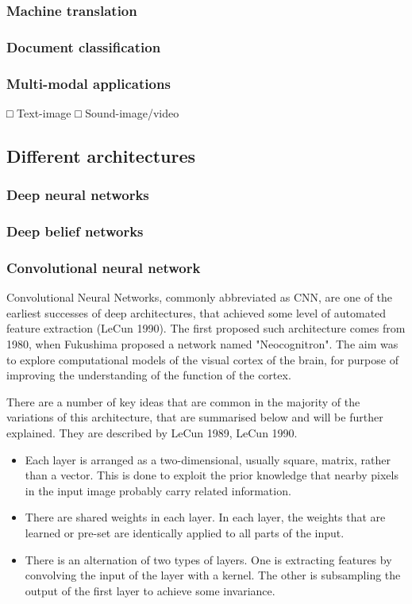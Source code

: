 \documentclass[]{article}
\begin{document}
		\subsubsection{Machine translation}
		\subsubsection{Document classification}
		\subsubsection{Multi-modal applications}
			□ Text-image
			□ Sound-image/video
	\subsection{Different architectures}
		\subsubsection{Deep neural networks}		
		\subsubsection{Deep belief networks}
		\subsubsection{Convolutional neural network}
			Convolutional Neural Networks, commonly abbreviated as CNN, are one of the earliest successes of deep architectures, that achieved some level of automated feature extraction (LeCun 1990). The first proposed such architecture comes from 1980, when Fukushima proposed a network named "Neocognitron". The aim was to explore computational models of the visual cortex of the brain, for purpose of improving the understanding of the function of the cortex.
			
			There are a number of key ideas that are common in the majority of the variations of this architecture, that are summarised below and will be further explained. They are described by LeCun 1989, LeCun 1990.
			\cite{Bengio2007}

			\begin{itemize}
				\item Each layer is arranged as a two-dimensional, usually square, matrix, rather than a vector. This is done to exploit the prior knowledge that nearby pixels in the input image probably carry related information.
				\item There are shared weights in each layer. In each layer, the weights that are learned or pre-set are identically applied to all parts of the input.
				\item There is an alternation of two types of layers. One is extracting features by convolving the input of the layer with a kernel. The other is subsampling the output of the first layer to achieve some invariance.				
			\end{itemize}
			
\end{document}
